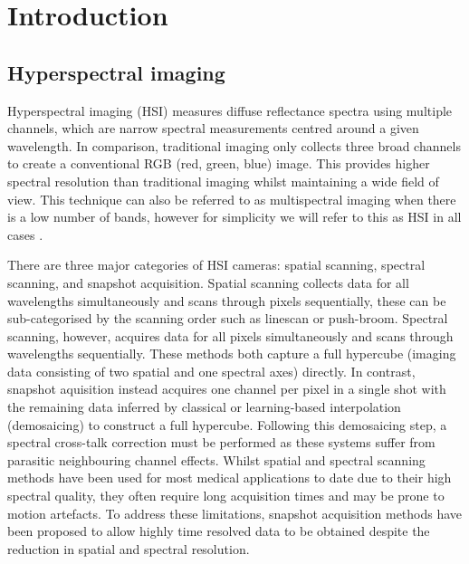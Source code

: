 \chapter{Introduction}
\label{chap:intro}
\minitoc


\section{Hyperspectral imaging}
Hyperspectral imaging (HSI) measures diffuse reflectance spectra using multiple channels, which are narrow spectral measurements centred around a given wavelength. In comparison, traditional imaging only collects three broad channels to create a conventional RGB (red, green, blue) image. This provides higher spectral resolution than traditional imaging whilst maintaining a wide field of view. This technique can also
be referred to as multispectral imaging when there is a low number of bands, however for simplicity we will refer to this as HSI in all cases \cite{Clancy2020}.

There are three major categories of HSI cameras: spatial scanning, spectral scanning, and snapshot acquisition. Spatial scanning collects data for all wavelengths simultaneously and scans through pixels sequentially, these can be sub-categorised by the scanning order such as linescan or push-broom. Spectral scanning, however, acquires data for all pixels simultaneously and scans through wavelengths sequentially. These methods both capture a full hypercube (imaging data consisting of two spatial and one spectral axes) directly. In contrast, snapshot aquisition instead acquires one channel per pixel in a single shot\cite{Geelen2014} with the remaining data inferred by classical or learning-based\cite{Li2021} interpolation (demosaicing) to construct a full hypercube. Following this demosaicing step, a spectral cross-talk correction must be performed as these systems suffer from parasitic neighbouring channel effects\cite{Pichette2017}. Whilst spatial and spectral scanning methods have been used for most medical applications to date due to their high spectral quality, they often require long acquisition times and may be prone to motion artefacts\cite{Kulcke2018, Giannoni2021, Shapey2019, Yoon2021}. To address these limitations, snapshot acquisition methods have been proposed to allow highly time resolved data to be obtained despite the reduction in spatial and spectral resolution\cite{Ayala2021, Ebner2021}. 

